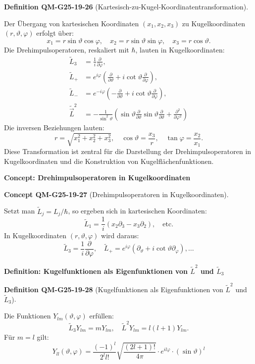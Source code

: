 \documentclass[10pt, letterpaper]{article}
\newcommand{\CustomHeading}[3]{%
  \par\medskip\noindent%
  \textbf{#1 #2} \textnormal{(#3)}.\enskip%
}
\newenvironment{DEF}[2]{\begin{unitbox}\CustomHeading{Definition}{#1}{#2}}{\end{unitbox}}
\newenvironment{CONC}[2]{\begin{unitbox}\CustomHeading{Concept}{#1}{#2}}{\end{unitbox}}
\begin{document}
\begin{DEF}{QM-G25-19-26}{Kartesisch-zu-Kugel-Koordinatentransformation}
Der Übergang von kartesischen Koordinaten \((x_1, x_2, x_3)\) zu Kugelkoordinaten \((r, \vartheta, \varphi)\) erfolgt über:
$$
x_1 = r \sin \vartheta \cos \varphi, \quad
x_2 = r \sin \vartheta \sin \varphi, \quad
x_3 = r \cos \vartheta.
$$
Die Drehimpulsoperatoren, reskaliert mit \(\hbar\), lauten in Kugelkoordinaten:
$$
\begin{aligned}
\tilde{L}_3 &= \frac{1}{i} \frac{\partial}{\partial \varphi}, \\
\tilde{L}_{+} &= e^{i \varphi} \left( \frac{\partial}{\partial \vartheta} + i \cot \vartheta \frac{\partial}{\partial \varphi} \right), \\
\tilde{L}_{-} &= e^{-i \varphi} \left( -\frac{\partial}{\partial \vartheta} + i \cot \vartheta \frac{\partial}{\partial \varphi} \right), \\
\tilde{\vec{L}}^2 &= -\frac{1}{\sin^2 \vartheta} \left( \sin \vartheta \frac{\partial}{\partial \vartheta} \sin \vartheta \frac{\partial}{\partial \vartheta} + \frac{\partial^2}{\partial \varphi^2} \right)
\end{aligned}
$$
Die inversen Beziehungen lauten:
$$
r = \sqrt{x_1^2 + x_2^2 + x_3^2}, \quad
\cos \vartheta = \frac{x_3}{r}, \quad
\tan \varphi = \frac{x_2}{x_1}.
$$
Diese Transformation ist zentral für die Darstellung der Drehimpulsoperatoren in Kugelkoordinaten und die Konstruktion von Kugelflächenfunktionen.
\end{DEF}


\textbf{Concept: Drehimpulsoperatoren in Kugelkoordinaten}


\begin{CONC}{QM-G25-19-27}{Drehimpulsoperatoren in Kugelkoordinaten}
Setzt man \(\tilde{L}_j = L_j / \hbar\), so ergeben sich in kartesischen Koordinaten:
$$
\tilde{L}_1 = \frac{1}{i}(x_2 \partial_3 - x_3 \partial_2), \quad \text{etc.}
$$
In Kugelkoordinaten \((r, \vartheta, \varphi)\) wird daraus:
$$
\tilde{L}_3 = \frac{1}{i} \frac{\partial}{\partial \varphi}, \quad
\tilde{L}_+ = e^{i \varphi} \left( \partial_\vartheta + i \cot \vartheta \partial_\varphi \right), \dots
$$
\end{CONC}


\textbf{Definition: Kugelfunktionen als Eigenfunktionen von \(\tilde{L}^2\) und \(\tilde{L}_3\)}  


\begin{DEF}{QM-G25-19-28}{Kugelfunktionen als Eigenfunktionen von \(\tilde{L}^2\) und \(\tilde{L}_3\)}
Die Funktionen \(Y_{lm}(\vartheta, \varphi)\) erfüllen:
$$
\tilde{L}_3 Y_{lm} = m Y_{lm}, \quad \tilde{L}^2 Y_{lm} = l(l+1) Y_{lm}.
$$
Für \(m = l\) gilt:
$$
Y_{ll}(\vartheta, \varphi) = \frac{(-1)^l}{2^l l!} \sqrt{\frac{(2l+1)!}{4\pi}} \cdot e^{i l \varphi} \cdot (\sin \vartheta)^l
$$
\end{DEF}
\end{document}
